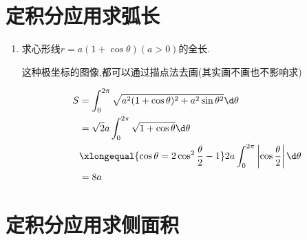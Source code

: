 \documentclass[12pt, a4paper, oneside, UTF8]{ctexbook}
\begin{document}
\section{ 定积分应用求弧长}

\begin{enumerate}[label=\arabic*.,start=18]
    \item 求心形线$r=a(1+\cos\theta)(a>0)$的全长.
    
    \begin{solution}
    这种极坐标的图像,都可以通过描点法去画(其实画不画也不影响求) 
    \begin{center}
    \end{center}
    \begin{align*}
        S &=\int_{0}^{2\pi}\sqrt{a^2(1+\cos{\theta})^2+a^2\sin{\theta}^2}\d \theta \\
        &=\sqrt{2}a\int_{0}^{2\pi}\sqrt{1+\cos{\theta}}\d \theta \\
        &\xlongequal{\cos{\theta}=2\cos^2{\frac{\theta}{2}}-1}2a\int_{0}^{2\pi}\left|\cos\frac{\theta}{2}\right|\d\theta \\
        &=8a
    \end{align*}
    \end{solution}
\end{enumerate}

\section{ 定积分应用求侧面积}
\end{document}
